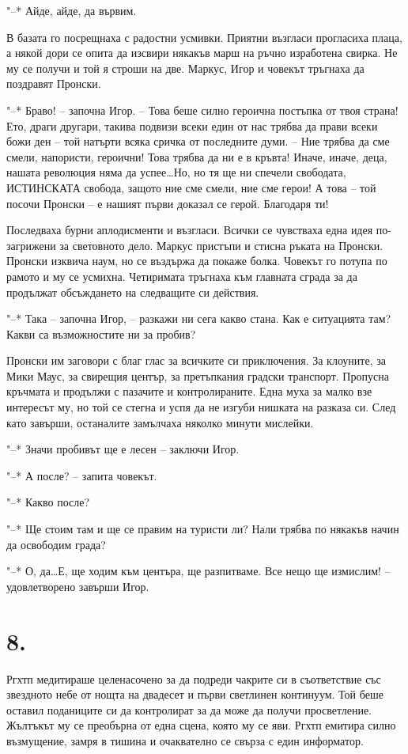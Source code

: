 \documentclass[ebook,openany,12pt]{memoir}
\begin{document}
"--* Айде, айде, да вървим.

В базата го посрещнаха с радостни усмивки. Приятни възгласи прогласиха плаца, а някой дори се опита да изсвири някакъв марш на ръчно изработена свирка. Не му се получи и той я строши на две. Маркус, Игор и човекът тръгнаха да поздравят Пронски.

"--* Браво! – започна Игор. – Това беше силно героична постъпка от твоя страна! Ето, драги другари, такива подвизи всеки един от нас трябва да прави всеки божи ден – той натърти всяка сричка от последните думи. – Ние трябва да сме смели, напористи, героични! Това трябва да ни е в кръвта! Иначе, иначе, деца, нашата революция няма да успее\ldots Но, но тя ще ни спечели свободата, ИСТИНСКАТА свобода, защото ние сме смели, ние сме герои! А това – той посочи Пронски – е нашият първи доказал се герой. Благодаря ти!

Последваха бурни аплодисменти и възгласи. Всички се чувстваха една идея по-загрижени за световното дело. Маркус пристъпи и стисна ръката на Пронски. Пронски изквича наум, но се въздържа да покаже болка. Човекът го потупа по рамото и му се усмихна. Четиримата тръгнаха към главната сграда за да продължат обсъждането на следващите си действия.

"--* Така – започна Игор, – разкажи ни сега какво стана. Как е ситуацията там? Какви са възможностите ни за пробив?

Пронски им заговори с благ глас за всичките си приключения. За клоуните, за Мики Маус, за свирещия център, за претъпкания градски транспорт. Пропусна кръчмата и продължи с пазачите и контролираните. Една муха за малко взе интересът му, но той се стегна и успя да не изгуби нишката на разказа си. След като завърши, останалите замълчаха няколко минути мислейки.

"--* Значи пробивът ще е лесен – заключи Игор.

"--* А после? – запита човекът.

"--* Какво после?

"--* Ще стоим там и ще се правим на туристи ли? Нали трябва по някакъв начин да освободим града?

"--* О, да\ldots Е, ще ходим към центъра, ще разпитваме. Все нещо ще измислим! – удовлетворено завърши Игор.

\section*{8.}

Ргхтп медитираше целенасочено за да подреди чакрите си в съответствие със звездното небе от нощта на двадесет и първи светлинен континуум. Той беше оставил поданиците си да контролират за да може да получи просветление. Жълтъкът му се преобърна от една сцена, която му се яви. Ргхтп емитира силно възмущение, замря в тишина и очаквателно се свърза с един информатор.
\end{document}
